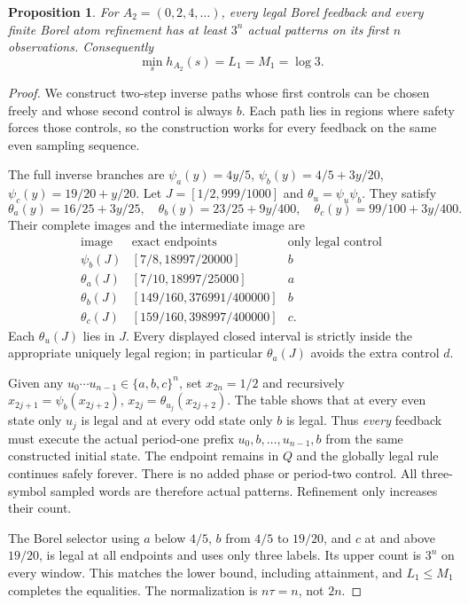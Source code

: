 \documentclass[11pt,reqno]{amsart}
\numberwithin{equation}{section}
\newtheorem{proposition}[theorem]{Proposition}
\theoremstyle{definition}
\theoremstyle{definition}
\begin{document}
\begin{proposition}\label{prop:bridge}
For $A_2=(0,2,4,\ldots)$, every legal Borel feedback and every
finite Borel atom refinement has at least $3^n$ actual patterns
on its first $n$ observations. Consequently
\[
 \min_s h_{A_2}(s)=L_1=M_1=\log3.
\]
\end{proposition}
\begin{proof}
We construct two-step inverse paths whose first controls can be
chosen freely and whose second control is always $b$. Each path lies
in regions where safety forces those controls, so the construction
works for every feedback on the same even sampling sequence.

The full inverse branches are
$\psi_a(y)=4y/5$, $\psi_b(y)=4/5+3y/20$,
$\psi_c(y)=19/20+y/20$. Let $J=[1/2,999/1000]$ and
$\theta_u=\psi_u\psi_b$. They satisfy
\[
 \theta_a(y)=16/25+3y/25,\quad
 \theta_b(y)=23/25+9y/400,\quad
 \theta_c(y)=99/100+3y/400.
\]
Their complete images and the intermediate image are
\[
\begin{array}{c|c|c}
 \text{image}&\text{exact endpoints}&\text{only legal control}\\\hline
 \psi_b(J)&[7/8,18997/20000]&b\\
 \theta_a(J)&[7/10,18997/25000]&a\\
 \theta_b(J)&[149/160,376991/400000]&b\\
 \theta_c(J)&[159/160,398997/400000]&c.
\end{array}
\]
Each $\theta_u(J)$ lies in $J$. Every displayed closed interval
is strictly inside the appropriate uniquely legal region; in
particular $\theta_a(J)$ avoids the extra control $d$.

Given any $u_0\cdots u_{n-1}\in\{a,b,c\}^n$, set
$x_{2n}=1/2$ and recursively
$x_{2j+1}=\psi_b(x_{2j+2})$,
$x_{2j}=\theta_{u_j}(x_{2j+2})$.
The table shows that at every even state only $u_j$ is legal
and at every odd state only $b$ is legal. Thus \emph{every}
feedback must execute the actual period-one prefix
$u_0,b,\ldots,u_{n-1},b$ from the same constructed initial state.
The endpoint remains in $Q$ and the globally legal rule continues
safely forever. There is no added phase or period-two control.
All three-symbol sampled words are therefore actual patterns.
Refinement only increases their count.

The Borel selector using $a$ below $4/5$, $b$ from $4/5$ to
$19/20$, and $c$ at and above $19/20$, is legal at all endpoints
and uses only three labels. Its upper count is $3^n$ on every
window. This matches the lower bound, including attainment, and
$L_1\le M_1$ completes the equalities. The normalization is
$n\tau=n$, not $2n$.
\end{proof}
\end{document}
